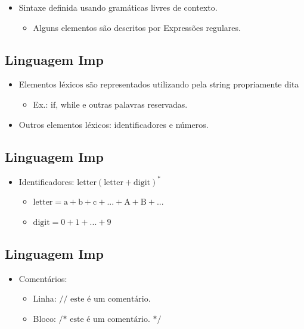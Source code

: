 \documentclass[11pt]{article}
\begin{document}
\begin{itemize}
\item Sintaxe definida usando gramáticas livres de contexto.
\begin{itemize}
\item Alguns elementos são descritos por Expressões regulares.
\end{itemize}
\end{itemize}
\subsection*{Linguagem Imp}
\label{sec:orga94f5d9}

\begin{itemize}
\item Elementos \(\mathrm{léxicos}\) são representados utilizando pela string propriamente dita
\begin{itemize}
\item Ex.: \(\mathrm{if}\), \(\mathrm{while}\) e outras palavras reservadas.
\end{itemize}

\item Outros elementos léxicos: identificadores e números.
\end{itemize}
\subsection*{Linguagem Imp}
\label{sec:orgea12361}

\begin{itemize}
\item Identificadores: \(\mathrm{letter(letter + digit)^*}\)
\begin{itemize}
\item \(\mathrm{letter = a + b + c + ... + A + B + ...}\)
\item \(\mathrm{digit = 0 + 1 + ... + 9}\)
\end{itemize}
\end{itemize}
\subsection*{Linguagem Imp}
\label{sec:org2861e1b}

\begin{itemize}
\item Comentários:
\begin{itemize}
\item Linha: \(\textrm{// este é um comentário.}\)
\item Bloco: \(\textrm{/* este é um comentário. */}\)
\end{itemize}
\end{itemize}
\end{document}
